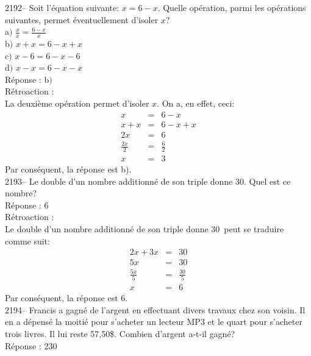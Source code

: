 \documentclass[letterpaper, 12pt]{article}
\begin{document}
2192-- Soit l'\'equation suivante: $x=6-x$. Quelle op\'eration, parmi les op\'erations suivantes, permet \'eventuellement d'isoler $x$?\\

a$)$ $\frac{x}{x}=\frac{6-x}{x}$\\[2mm]
b$)$ $x+x=6-x+x$\\[2mm]
c$)$ $x-6=6-x-6$\\[2mm]
d$)$ $x-x=6-x-x$\\

R\'eponse : b$)$ \\

R\'etroaction :\\
La deuxi\`eme op\'eration permet d'isoler $x$. On a, en effet, ceci:
\begin{eqnarray*}
 x&=&6-x\\
x+x&=&6-x+x\\
2x&=&6\\[2mm]
\frac{2x}{2}&=&\frac{6}{2}\\[2mm]
x&=&3
\end{eqnarray*}
Par cons\'equent, la r\'eponse est b).\\

2193-- Le double d'un nombre additionn\'e de son triple donne 30. Quel est ce nombre?\\

R\'eponse : 6 \\

R\'etroaction :\\
\og Le double d'un nombre additionn\'e de son triple donne 30\fg\, peut se traduire comme suit:
\begin{eqnarray*}
 2x+3x&=&30\\
5x&=&30\\[2mm]
\frac{5x}{5}&=&\frac{30}{5}\\[2mm]
x&=&6
\end{eqnarray*}
Par cons\'equent, la r\'eponse est 6.\\

2194-- Francis a gagn\'e de l'argent en effectuant divers travaux chez son voisin. Il en a d\'epens\'e la moiti\'e pour s'acheter un lecteur MP3 et le quart pour s'acheter trois livres. Il lui reste 57,50\$. Combien d'argent a-t-il gagn\'e?\\

R\'eponse : 230\\
\end{document}
